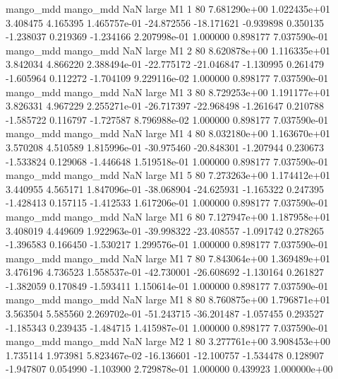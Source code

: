 mango_mdd mango_mdd                   NaN      large       M1                 1 80 7.681290e+00   1.022435e+01      3.408475       4.165395  1.465757e-01    -24.872556    -18.171621    -0.939898       0.350135 -1.238037   0.219369    -1.234166   2.207998e-01            1.000000        0.898177        7.037590e-01
mango_mdd mango_mdd                   NaN      large       M1                 2 80 8.620878e+00   1.116335e+01      3.842034       4.866220  2.388494e-01    -22.775172    -21.046847    -1.130995       0.261479 -1.605964   0.112272    -1.704109   9.229116e-02            1.000000        0.898177        7.037590e-01
mango_mdd mango_mdd                   NaN      large       M1                 3 80 8.729253e+00   1.191177e+01      3.826331       4.967229  2.255271e-01    -26.717397    -22.968498    -1.261647       0.210788 -1.585722   0.116797    -1.727587   8.796988e-02            1.000000        0.898177        7.037590e-01
mango_mdd mango_mdd                   NaN      large       M1                 4 80 8.032180e+00   1.163670e+01      3.570208       4.510589  1.815996e-01    -30.975460    -20.848301    -1.207944       0.230673 -1.533824   0.129068    -1.446648   1.519518e-01            1.000000        0.898177        7.037590e-01
mango_mdd mango_mdd                   NaN      large       M1                 5 80 7.273263e+00   1.174412e+01      3.440955       4.565171  1.847096e-01    -38.068904    -24.625931    -1.165322       0.247395 -1.428413   0.157115    -1.412533   1.617206e-01            1.000000        0.898177        7.037590e-01
mango_mdd mango_mdd                   NaN      large       M1                 6 80 7.127947e+00   1.187958e+01      3.408019       4.449609  1.922963e-01    -39.998322    -23.408557    -1.091742       0.278265 -1.396583   0.166450    -1.530217   1.299576e-01            1.000000        0.898177        7.037590e-01
mango_mdd mango_mdd                   NaN      large       M1                 7 80 7.843064e+00   1.369489e+01      3.476196       4.736523  1.558537e-01    -42.730001    -26.608692    -1.130164       0.261827 -1.382059   0.170849    -1.593411   1.150614e-01            1.000000        0.898177        7.037590e-01
mango_mdd mango_mdd                   NaN      large       M1                 8 80 8.760875e+00   1.796871e+01      3.563504       5.585560  2.269702e-01    -51.243715    -36.201487    -1.057455       0.293527 -1.185343   0.239435    -1.484715   1.415987e-01            1.000000        0.898177        7.037590e-01
mango_mdd mango_mdd                   NaN      large       M2                 1 80 3.277761e+00   3.908453e+00      1.735114       1.973981  5.823467e-02    -16.136601    -12.100757    -1.534478       0.128907 -1.947807   0.054990    -1.103900   2.729878e-01            1.000000        0.439923        1.000000e+00
